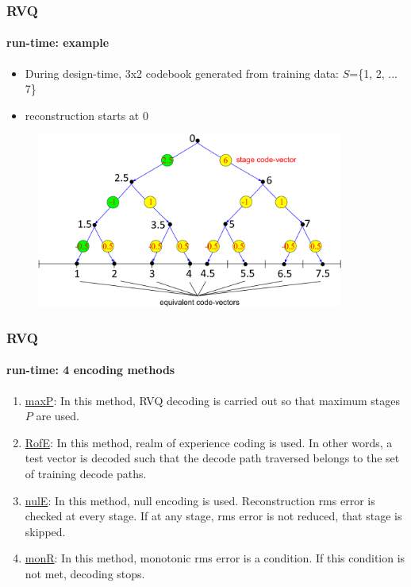 \begin{frame}
\frametitle{RVQ}
\framesubtitle{run-time: example}
\mypagenum
\begin{itemize}
\item During design-time, 3x2 codebook generated from training data: $S$=\{1, 2, ... 7\}
\item reconstruction starts at 0
\end{itemize}
\begin{figure}[t]
\centering
\includegraphics[width=0.9\textwidth]{thesis/RVQ_trg_1_to_7_equivalentCVs.pdf}
\end{figure}
\end{frame}



\begin{frame}
\frametitle{RVQ}
\framesubtitle{run-time: 4 encoding methods}
\mypagenum
\begin{enumerate}
\item \underline{maxP}: In this method, RVQ decoding is carried out so that maximum stages $P$ are used.
\item \underline{RofE}: In this method, realm of experience coding is used.  In other words, a test vector is decoded such that the decode path traversed belongs to the set of training decode paths.
\item \underline{nulE}: In this method, null encoding is used.  Reconstruction rms error is checked at every stage.  If at any stage, rms error is not reduced, that stage is skipped.
\item \underline{monR}: In this method, monotonic rms error is a condition.  If this condition is not met, decoding stops.
\end{enumerate}
\end{frame}




